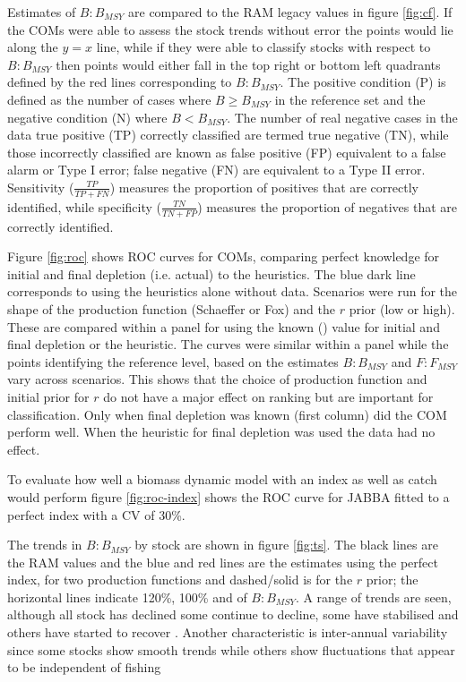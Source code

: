 Estimates of $B:B_{MSY}$ are compared to the RAM legacy values in figure \ref{fig:cf}.  If the COMs were able to assess the stock trends without error the points would lie along the $y=x$ line, while if they were able to classify stocks with respect to $B:B_{MSY}$ then points would either fall in the top right or bottom left quadrants defined by the red lines corresponding to $B:B_{MSY}$. The positive condition (P) is defined as the number of cases where $B \geq B_{MSY}$ in the reference set and the negative condition (N) where $B<B_{MSY}$. The number of real negative cases in the data true positive (TP) correctly classified are termed true negative (TN), while those incorrectly classified are known as false positive (FP) equivalent to a false alarm or Type I error; false negative (FN) are equivalent to a Type II error. Sensitivity ($\frac{TP}{TP+FN}$) measures the proportion of positives that are correctly identified, while specificity ($\frac{TN}{TN+FP}$) measures the proportion of negatives that are correctly identified.

Figure \ref{fig:roc} shows ROC curves for COMs, comparing perfect knowledge for initial and final depletion (i.e. actual) to the heuristics. The blue dark line corresponds to using the heuristics alone without data. Scenarios were run for the shape of the production function (Schaeffer or Fox) and the $r$ prior (low or high). These are compared within a panel for using the known () value for initial and final depletion or the heuristic. The curves were similar within a panel while the points identifying the reference level, based on the estimates $B:B_{MSY}$ and $F:F_{MSY}$vary across scenarios. This shows that the choice of production function and initial prior for $r$ do not have a major effect on ranking but are important for classification.
Only when final depletion was known (first column) did the COM perform well. When the heuristic for final depletion was used the data had no effect.

To evaluate how well a biomass dynamic model with an index as well as catch would perform figure \ref{fig:roc-index} shows the ROC curve for JABBA fitted to a perfect index with a CV of 30\%.

The trends in $B:B_{MSY}$ by stock are shown in figure \ref{fig:ts}. The black lines are the RAM values and the blue and red lines are the estimates using the perfect index, for two production functions  and dashed/solid is for the $r$ prior; the horizontal lines indicate 120\%, 100\% and  of $B:B_{MSY}$. A range of trends are seen, although all stock has declined some continue to decline, some have stabilised  and others have started to recover . Another characteristic is inter-annual variability since some stocks  show smooth trends while others show fluctuations that appear to be independent of fishing 









